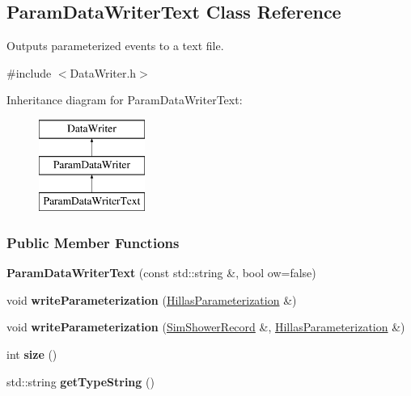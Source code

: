 \hypertarget{classParamDataWriterText}{
\subsection{ParamDataWriterText Class Reference}
\label{classParamDataWriterText}
}


Outputs parameterized events to a text file.  




{\ttfamily \#include $<$DataWriter.h$>$}

Inheritance diagram for ParamDataWriterText:\begin{figure}[H]
\begin{center}
\leavevmode
\includegraphics[height=3.000000cm]{classParamDataWriterText}
\end{center}
\end{figure}
\subsubsection*{Public Member Functions}
\begin{DoxyCompactItemize}
\item 
\hypertarget{classParamDataWriterText_a5e5452f5ef2af190c9db883ebd61a556}{
{\bfseries ParamDataWriterText} (const std::string \&, bool ow=false)}
\label{classParamDataWriterText_a5e5452f5ef2af190c9db883ebd61a556}

\item 
\hypertarget{classParamDataWriterText_a7e011f87421ebbdef958b7ba3e952802}{
void {\bfseries writeParameterization} (\hyperlink{structHillasParameterization}{HillasParameterization} \&)}
\label{classParamDataWriterText_a7e011f87421ebbdef958b7ba3e952802}

\item 
\hypertarget{classParamDataWriterText_a1623b4a0a5f2a1bc12b01ace24de91a3}{
void {\bfseries writeParameterization} (\hyperlink{structSimShowerRecord}{SimShowerRecord} \&, \hyperlink{structHillasParameterization}{HillasParameterization} \&)}
\label{classParamDataWriterText_a1623b4a0a5f2a1bc12b01ace24de91a3}

\item 
\hypertarget{classParamDataWriterText_aea625ba1c3132c1dabe138749ae5950a}{
int {\bfseries size} ()}
\label{classParamDataWriterText_aea625ba1c3132c1dabe138749ae5950a}

\item 
\hypertarget{classParamDataWriterText_a56b35c1b1018745bfff6faf757fd58b4}{
std::string {\bfseries getTypeString} ()}
\label{classParamDataWriterText_a56b35c1b1018745bfff6faf757fd58b4}

\end{DoxyCompactItemize}


